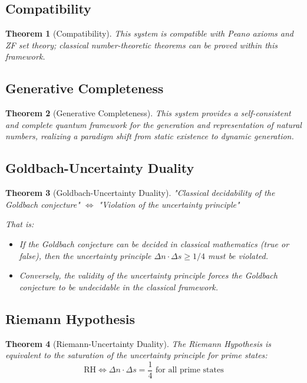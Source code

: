 \documentclass[12pt]{article}
\newtheorem{theorem}{Theorem}[section]
\theoremstyle{definition}
\begin{document}
\subsection{Compatibility}

\begin{theorem}[Compatibility]
This system is compatible with Peano axioms and ZF set theory; classical number-theoretic theorems can be proved within this framework.
\end{theorem}

\subsection{Generative Completeness}

\begin{theorem}[Generative Completeness]
This system provides a self-consistent and complete quantum framework for the generation and representation of natural numbers, realizing a paradigm shift from static existence to dynamic generation.
\end{theorem}

\subsection{Goldbach-Uncertainty Duality}

\begin{theorem}[Goldbach-Uncertainty Duality]
"Classical decidability of the Goldbach conjecture" \(\Longleftrightarrow\) "Violation of the uncertainty principle"

That is:
\begin{itemize}
    \item If the Goldbach conjecture can be decided in classical mathematics (true or false), then the uncertainty principle \(\Delta n \cdot \Delta s \geq 1/4\) must be violated.
    \item Conversely, the validity of the uncertainty principle forces the Goldbach conjecture to be undecidable in the classical framework.
\end{itemize}
\end{theorem}

\subsection{Riemann Hypothesis}

\begin{theorem}[Riemann-Uncertainty Duality]
The Riemann Hypothesis is equivalent to the saturation of the uncertainty principle for prime states:
\[
\boxed{\text{RH} \iff \Delta n \cdot \Delta s = \frac{1}{4} \text{ for all prime states}}
\]
\end{theorem}
\end{document}
